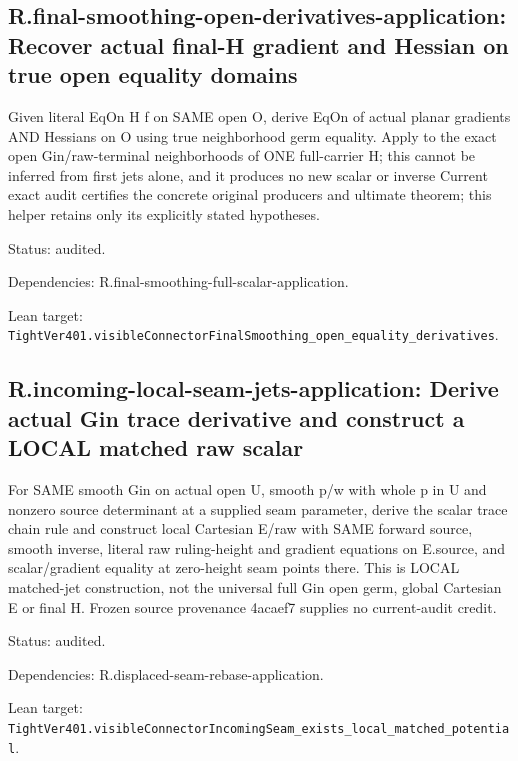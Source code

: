 \documentclass{article}
\begin{document}
\subsection*{R.final-smoothing-open-derivatives-application: Recover actual final-H gradient and Hessian on true open equality domains}
Given literal EqOn H f on SAME open O, derive EqOn of actual planar gradients AND Hessians on O using true neighborhood germ equality. Apply to the exact open Gin/raw-terminal neighborhoods of ONE full-carrier H; this cannot be inferred from first jets alone, and it produces no new scalar or inverse Current exact audit certifies the concrete original producers and ultimate theorem; this helper retains only its explicitly stated hypotheses.
\par Status: audited.
\par Dependencies: R.final-smoothing-full-scalar-application.
\par Lean target: \texttt{TightVer401.visibleConnectorFinalSmoothing\_open\_equality\_derivatives}.
\subsection*{R.incoming-local-seam-jets-application: Derive actual Gin trace derivative and construct a LOCAL matched raw scalar}
For SAME smooth Gin on actual open U, smooth p/w with whole p in U and nonzero source determinant at a supplied seam parameter, derive the scalar trace chain rule and construct local Cartesian E/raw with SAME forward source, smooth inverse, literal raw ruling-height and gradient equations on E.source, and scalar/gradient equality at zero-height seam points there. This is LOCAL matched-jet construction, not the universal full Gin open germ, global Cartesian E or final H. Frozen source provenance 4acaef7 supplies no current-audit credit.
\par Status: audited.
\par Dependencies: R.displaced-seam-rebase-application.
\par Lean target: \texttt{TightVer401.visibleConnectorIncomingSeam\_exists\_local\_matched\_potential}.
\end{document}
